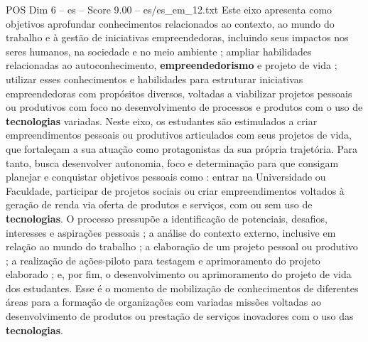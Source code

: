 \begin{textsample}{POS Dim 6 – es – Score 9.00 – es/es\_em\_12.txt}
Este eixo apresenta como objetivos aprofundar conhecimentos relacionados ao contexto, ao mundo do trabalho e à gestão de iniciativas empreendedoras, incluindo seus impactos nos seres humanos, na sociedade e no meio ambiente ; ampliar habilidades relacionadas ao autoconhecimento, \textbf{empreendedorismo} e projeto de vida ; utilizar esses conhecimentos e habilidades para estruturar iniciativas empreendedoras com propósitos diversos, voltadas a viabilizar projetos pessoais ou produtivos com foco no desenvolvimento de processos e produtos com o uso de \textbf{tecnologias} variadas.
Neste eixo, os estudantes são estimulados a criar empreendimentos pessoais ou produtivos articulados com seus projetos de vida, que fortaleçam a sua atuação como protagonistas da sua própria trajetória.
Para tanto, busca desenvolver autonomia, foco e determinação para que consigam planejar e conquistar objetivos pessoais como : entrar na Universidade ou Faculdade, participar de projetos sociais ou criar empreendimentos voltados à geração de renda via oferta de produtos e serviços, com ou sem uso de \textbf{tecnologias}.
O processo pressupõe a identificação de potenciais, desafios, interesses e aspirações pessoais ; a análise do contexto externo, inclusive em relação ao mundo do trabalho ; a elaboração de um projeto pessoal ou produtivo ; a realização de ações-piloto para testagem e aprimoramento do projeto elaborado ; e, por fim, o desenvolvimento ou aprimoramento do projeto de vida dos estudantes.
Esse é o momento de mobilização de conhecimentos de diferentes áreas para a formação de organizações com variadas missões voltadas ao desenvolvimento de produtos ou prestação de serviços inovadores com o uso das \textbf{tecnologias}.

\end{textsample}
